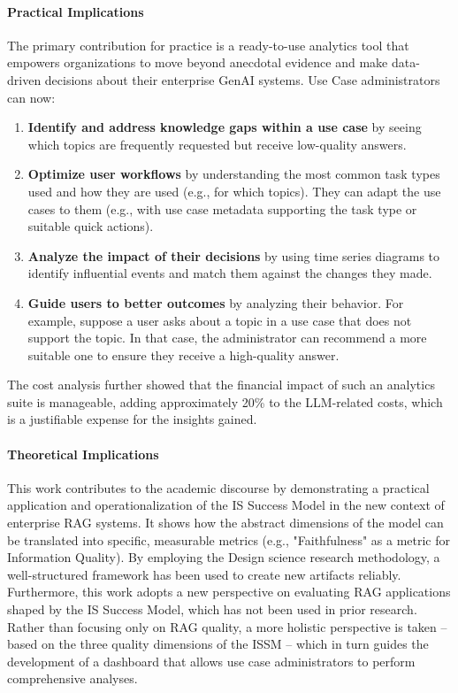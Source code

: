 \documentclass[
	english,
	ruledheaders=section,%
	class=report,%
	thesis={type=bachelor},%
	accentcolor=1b,%
	custommargins=true,%
	marginpar=false,%
	parskip=half-,%
	fontsize=11pt,%
	DIV=14,
]{tudapub}
\begin{document}
\paragraph{Practical Implications} The primary contribution for practice is a ready-to-use analytics tool that empowers organizations to move beyond anecdotal evidence and make data-driven decisions about their enterprise GenAI systems. Use Case administrators can now:
\begin{enumerate}
    \item \textbf{Identify and address knowledge gaps within a use case} by seeing which topics are frequently requested but receive low-quality answers.
    \item \textbf{Optimize user workflows} by understanding the most common task types used and how they are used (e.g., for which topics). They can adapt the use cases to them (e.g., with use case metadata supporting the task type or suitable quick actions).
    \item \textbf{Analyze the impact of their decisions} by using time series diagrams to identify influential events and match them against the changes they made.
    \item \textbf{Guide users to better outcomes} by analyzing their behavior. For example, suppose a user asks about a topic in a use case that does not support the topic. In that case, the administrator can recommend a more suitable one to ensure they receive a high-quality answer.
\end{enumerate}
The cost analysis further showed that the financial impact of such an analytics suite is manageable, adding approximately 20\% to the LLM-related costs, which is a justifiable expense for the insights gained.

\paragraph{Theoretical Implications} This work contributes to the academic discourse by demonstrating a practical application and operationalization of the IS Success Model in the new context of enterprise RAG systems. It shows how the abstract dimensions of the model can be translated into specific, measurable metrics (e.g., "Faithfulness" as a metric for Information Quality). By employing the Design science research methodology, a well-structured framework has been used to create new artifacts reliably. Furthermore, this work adopts a new perspective on evaluating RAG applications shaped by the IS Success Model, which has not been used in prior research. Rather than focusing only on RAG quality, a more holistic perspective is taken -- based on the three quality dimensions of the ISSM -- which in turn guides the development of a dashboard that allows use case administrators to perform comprehensive analyses.
\end{document}

